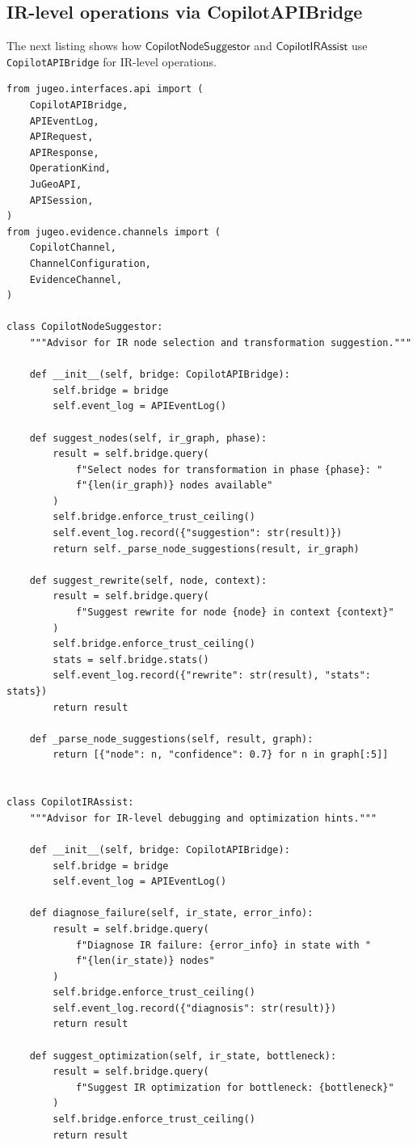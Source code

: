 \documentclass[11pt]{article}
\newcommand{\NodeSugg}{\mathsf{CopilotNodeSuggestor}}
\newcommand{\IRAssist}{\mathsf{CopilotIRAssist}}
\begin{document}
\subsection{IR-level operations via CopilotAPIBridge}

The next listing shows how $\NodeSugg$ and $\IRAssist$
use \texttt{CopilotAPIBridge} for IR-level operations.

\begin{lstlisting}[style=jugeo-python,
  caption={IR operations with CopilotAPIBridge},
  label={lst:irbridge}]
from jugeo.interfaces.api import (
    CopilotAPIBridge,
    APIEventLog,
    APIRequest,
    APIResponse,
    OperationKind,
    JuGeoAPI,
    APISession,
)
from jugeo.evidence.channels import (
    CopilotChannel,
    ChannelConfiguration,
    EvidenceChannel,
)

class CopilotNodeSuggestor:
    """Advisor for IR node selection and transformation suggestion."""

    def __init__(self, bridge: CopilotAPIBridge):
        self.bridge = bridge
        self.event_log = APIEventLog()

    def suggest_nodes(self, ir_graph, phase):
        result = self.bridge.query(
            f"Select nodes for transformation in phase {phase}: "
            f"{len(ir_graph)} nodes available"
        )
        self.bridge.enforce_trust_ceiling()
        self.event_log.record({"suggestion": str(result)})
        return self._parse_node_suggestions(result, ir_graph)

    def suggest_rewrite(self, node, context):
        result = self.bridge.query(
            f"Suggest rewrite for node {node} in context {context}"
        )
        self.bridge.enforce_trust_ceiling()
        stats = self.bridge.stats()
        self.event_log.record({"rewrite": str(result), "stats": stats})
        return result

    def _parse_node_suggestions(self, result, graph):
        return [{"node": n, "confidence": 0.7} for n in graph[:5]]


class CopilotIRAssist:
    """Advisor for IR-level debugging and optimization hints."""

    def __init__(self, bridge: CopilotAPIBridge):
        self.bridge = bridge
        self.event_log = APIEventLog()

    def diagnose_failure(self, ir_state, error_info):
        result = self.bridge.query(
            f"Diagnose IR failure: {error_info} in state with "
            f"{len(ir_state)} nodes"
        )
        self.bridge.enforce_trust_ceiling()
        self.event_log.record({"diagnosis": str(result)})
        return result

    def suggest_optimization(self, ir_state, bottleneck):
        result = self.bridge.query(
            f"Suggest IR optimization for bottleneck: {bottleneck}"
        )
        self.bridge.enforce_trust_ceiling()
        return result
\end{lstlisting}
\end{document}
